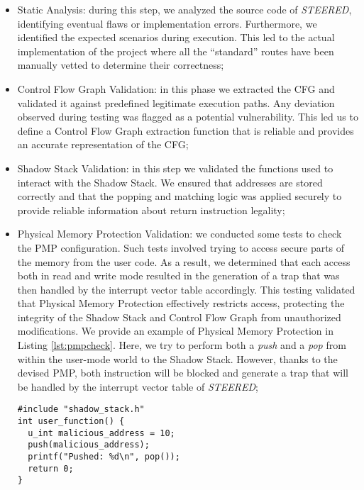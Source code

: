 \begin{itemize}
  \item Static Analysis: during this step, we analyzed the source code of \textit{STEERED},
    identifying eventual flaws or implementation errors. Furthermore, we identified
    the expected scenarios during execution. This led to the actual
    implementation of the project where all the ``standard'' routes have been
    manually vetted to determine their correctness;

  \item Control Flow Graph Validation: in this phase we extracted the CFG and
    validated it against predefined legitimate execution paths. Any deviation observed
    during testing was flagged as a potential vulnerability. This led us to
    define a Control Flow Graph extraction function that is reliable and
    provides an accurate representation of the CFG;

  \item Shadow Stack Validation: in this step we validated the functions used to
    interact with the Shadow Stack. We ensured that addresses are stored correctly
    and that the popping and matching logic was applied securely to provide reliable
    information about return instruction legality;

  \item Physical Memory Protection Validation: we conducted some tests to check
    the PMP configuration. Such tests involved trying to access secure parts of the
    memory from the user code. As a result, we determined that each access both in
    read and write mode resulted in the generation of a trap that was then handled
    by the interrupt vector table accordingly. This testing validated that
    Physical Memory Protection effectively restricts access, protecting the integrity
    of the Shadow Stack and Control Flow Graph from unauthorized modifications.
    We provide an example of Physical Memory Protection in Listing
    \ref{lst:pmpcheck}. Here, we try to perform both a \textit{push} and a \textit{pop}
    from within the user-mode world to the Shadow Stack. However, thanks to the
    devised PMP, both instruction will be blocked and generate a trap that will be
    handled by the interrupt vector table of \textit{STEERED};

    \begin{lstlisting}[style=CStyle, caption = PMP configuration validation, label={lst:pmpcheck}]
#include "shadow_stack.h"
int user_function() {
  u_int malicious_address = 10;
  push(malicious_address);
  printf("Pushed: %d\n", pop());
  return 0;
}
    \end{lstlisting}


\end{itemize}
